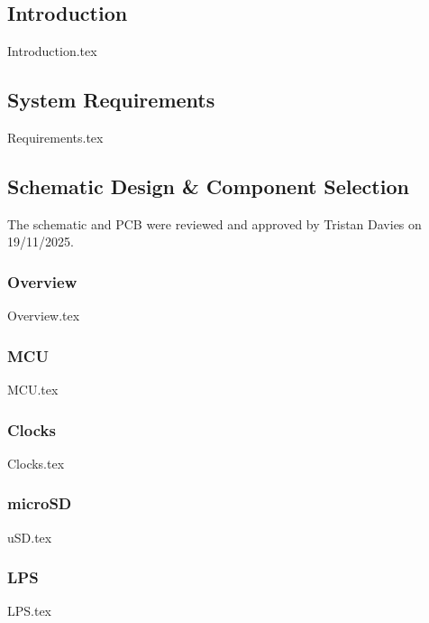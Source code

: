\subsection{Introduction}

    {Introduction.tex}

\subsection{System Requirements}

    {Requirements.tex}

\subsection{Schematic Design \& Component Selection}

    The schematic and PCB were reviewed and approved by Tristan Davies on 19/11/2025.

    \subsubsection{Overview}
        {Overview.tex}

    \subsubsection{MCU}\label{sec:v0.1-mcu}
        {MCU.tex}

    \subsubsection{Clocks}\label{sec:v0.1-clocks}
        {Clocks.tex}

    \subsubsection{microSD}
        {uSD.tex}

    \subsubsection{LPS}
        {LPS.tex}

